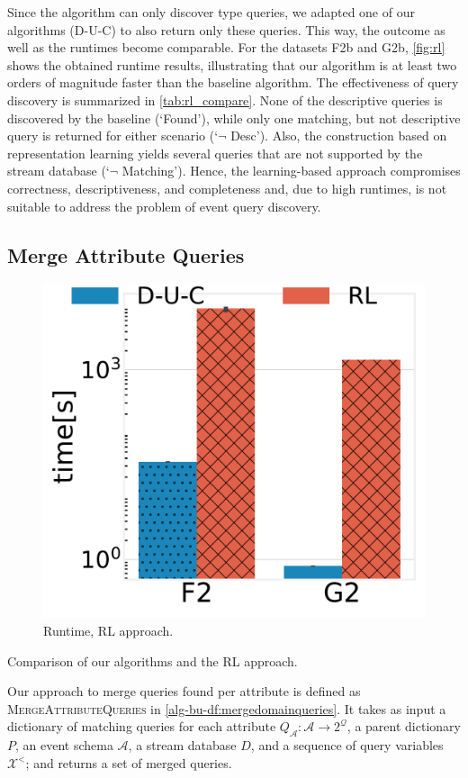 Since the algorithm can only discover type queries, we adapted one of our
algorithms (D-U-C) to also return only these queries.
This way, the outcome as well as the runtimes become comparable.
For the datasets F2b and G2b, \autoref{fig:rl} shows the obtained runtime
results, illustrating that our algorithm is at least two orders of magnitude
faster than the baseline algorithm. The effectiveness of query discovery is
summarized in \autoref{tab:rl_compare}. None of the descriptive queries is
discovered by the baseline (`Found'), while only one matching, but not
descriptive query is returned for either scenario (`$\neg$ Desc'). Also, the
construction based on representation learning yields several queries that
are not supported by the stream database (`$\neg$ Matching'). Hence, the
learning-based approach compromises correctness, descriptiveness, and
completeness and, due to high runtimes, is not suitable to address the
problem of
event query discovery.



\subsection{Merge Attribute Queries}
\label{sec:alg_merge_attribute}


\begin{figure}[t]
	\includegraphics[width=0.45\columnwidth]{img/rl_compare.pdf}
	\vspace{-1em}
	\caption{Runtime, RL approach.}
	\label{fig:rl}
\end{figure}

\begin{table}[t]
	\footnotesize
	\caption{Comparison of our algorithms and the RL approach.}
	\vspace{-1em}
	\label{tab:rl_compare}
	
\end{table}


Our approach to merge queries found per attribute is defined as
\textsc{MergeAttributeQueries} in \autoref{alg-bu-df:mergedomainqueries}.
It takes as input a dictionary of matching queries for each attribute
$Q_{\mathcal{A}}: \mathcal{A} \rightarrow 2^{\mathcal{Q}}$, a parent
dictionary $P$, an event schema $\mathcal{A}$, a stream database $D$, and a
sequence of query variables $\mathcal{X}^<$; and returns a set of merged
queries.

